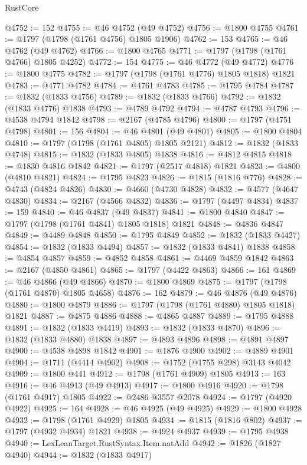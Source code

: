 \begin{lexlean}{RustCore}
\begin{coremodule}
@4752 := 152
@4755 := @46 @4752 (@49 @4752)
@4756 := @1800 @4755
@4761 := @1797 (@1798 (@1761 @4756) @1805 @1906)
@4762 := 153
@4765 := @46 @4762 (@49 @4762)
@4766 := @1800 @4765
@4771 := @1797 (@1798 (@1761 @4766) @1805 @4252)
@4772 := 154
@4775 := @46 @4772 (@49 @4772)
@4776 := @1800 @4775
@4782 := @1797 (@1798 (@1761 @4776) @1805 @1818) @1821
@4783 := @4771 @4782
@4784 := @4761 @4783
@4785 := @1795 @4784
@4787 := @1832 (@1833 @4756)
@4789 := @1832 (@1833 @4766)
@4792 := @1832 (@1833 @4776) @1838
@4793 := @4789 @4792
@4794 := @4787 @4793
@4796 := @4538 @4794 @1842
@4798 := @2167 (@4785 @4796)
@4800 := @1797 (@4751 @4798)
@4801 := 156
@4804 := @46 @4801 (@49 @4801)
@4805 := @1800 @4804
@4810 := @1797 (@1798 (@1761 @4805) @1805 @2121)
@4812 := @1832 (@1833 @4748)
@4815 := @1832 (@1833 @4805) @1838
@4816 := @4812 @4815
@4818 := @1830 @4816 @1842
@4821 := @1797 (@2517 @4818) @1821
@4823 := @4800 (@4810 @4821)
@4824 := @1795 @4823
@4826 := @1815 (@1816 @776)
@4828 := @4743 (@4824 @4826)
@4830 := @4660 (@4730 @4828)
@4832 := @4577 (@4647 @4830)
@4834 := @2167 (@4566 @4832)
@4836 := @1797 (@4497 @4834)
@4837 := 159
@4840 := @46 @4837 (@49 @4837)
@4841 := @1800 @4840
@4847 := @1797 (@1798 (@1761 @4841) @1805 @1818) @1821
@4848 := @4836 @4847
@4849 := @4489 @4848
@4850 := @1795 @4849
@4852 := @1832 (@1833 @4427)
@4854 := @1832 (@1833 @4494)
@4857 := @1832 (@1833 @4841) @1838
@4858 := @4854 @4857
@4859 := @4852 @4858
@4861 := @4469 @4859 @1842
@4863 := @2167 (@4850 @4861)
@4865 := @1797 (@4422 @4863)
@4866 := 161
@4869 := @46 @4866 (@49 @4866)
@4870 := @1800 @4869
@4875 := @1797 (@1798 (@1761 @4870) @1805 @4658)
@4876 := 162
@4879 := @46 @4876 (@49 @4876)
@4880 := @1800 @4879
@4886 := @1797 (@1798 (@1761 @4880) @1805 @1818) @1821
@4887 := @4875 @4886
@4888 := @4865 @4887
@4889 := @1795 @4888
@4891 := @1832 (@1833 @4419)
@4893 := @1832 (@1833 @4870)
@4896 := @1832 (@1833 @4880) @1838
@4897 := @4893 @4896
@4898 := @4891 @4897
@4900 := @4538 @4898 @1842
@4901 := @1876 @4900
@4902 := @4889 @4901
@4904 := @1711 (@4414 @4902)
@4908 := @1752 (@1755 @298) @3143 @4042
@4909 := @1800 @441
@4912 := @1798 (@1761 @4909) @1805
@4913 := 163
@4916 := @46 @4913 (@49 @4913)
@4917 := @1800 @4916
@4920 := @1798 (@1761 @4917) @1805
@4922 := @2486 @3557 @2078
@4924 := @1797 (@4920 @4922)
@4925 := 164
@4928 := @46 @4925 (@49 @4925)
@4929 := @1800 @4928
@4932 := @1798 (@1761 @4929) @1805
@4934 := @1815 (@1816 @802)
@4937 := @1797 (@4932 @4934) @1821
@4938 := @4924 @4937
@4939 := @1795 @4938
@4940 := LexLeanTarget.RustSyntax.Item.natAdd
@4942 := @1826 (@1827 @4940)
@4944 := @1832 (@1833 @4917)

\end{coremodule}
\end{lexlean}
